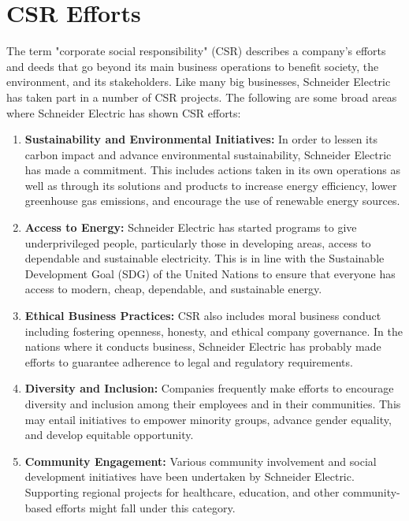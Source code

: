 \section{CSR Efforts}
The term "corporate social responsibility" (CSR) describes a company's efforts and deeds that go beyond its main business operations to benefit society, the environment, and its stakeholders. Like many big businesses, Schneider Electric has taken part in a number of CSR projects. The following are some broad areas where Schneider Electric has shown CSR efforts:

\begin{enumerate}
\item \textbf{Sustainability and Environmental Initiatives:} In order to lessen its carbon impact and advance environmental sustainability, Schneider Electric has made a commitment. This includes actions taken in its own operations as well as through its solutions and products to increase energy efficiency, lower greenhouse gas emissions, and encourage the use of renewable energy sources.

\item \textbf{Access to Energy: }Schneider Electric has started programs to give underprivileged people, particularly those in developing areas, access to dependable and sustainable electricity. This is in line with the Sustainable Development Goal (SDG) of the United Nations to ensure that everyone has access to modern, cheap, dependable, and sustainable energy.

\item\textbf{Ethical Business Practices:} CSR also includes moral business conduct including fostering openness, honesty, and ethical company governance. In the nations where it conducts business, Schneider Electric has probably made efforts to guarantee adherence to legal and regulatory requirements.

\item\textbf{Diversity and Inclusion:} Companies frequently make efforts to encourage diversity and inclusion among their employees and in their communities. This may entail initiatives to empower minority groups, advance gender equality, and develop equitable opportunity.

\item\textbf{Community Engagement:} Various community involvement and social development initiatives have been undertaken by Schneider Electric. Supporting regional projects for healthcare, education, and other community-based efforts might fall under this category.


\end{enumerate}

